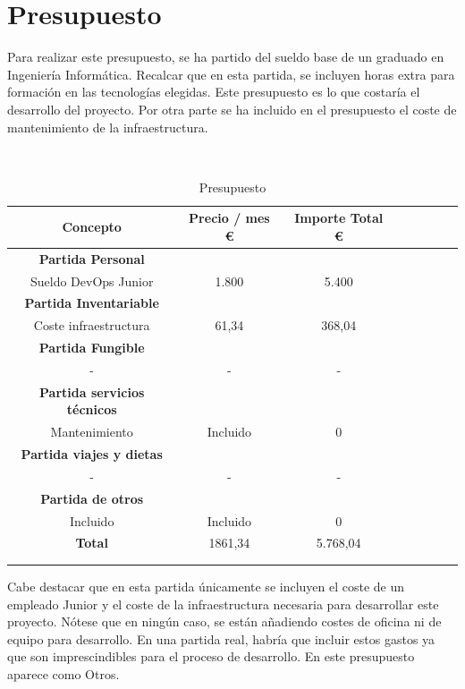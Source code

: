 \section{Presupuesto}
	\begin{text}
		Para realizar este presupuesto, se ha partido del sueldo base de un graduado en Ingeniería Informática. Recalcar que en esta partida, se incluyen horas extra para formación en las tecnologías elegidas. Este presupuesto es lo que costaría el desarrollo del proyecto.
		Por otra parte se ha incluido en el presupuesto el coste de mantenimiento de la infraestructura.
	\end{text}
	\\
	\begin{table}[ht]
		\centering
		\begin{tabular}[!hbt]{SSSSSSSS} \toprule
			{Concepto} &  {Precio / mes \euro} & {Importe Total \euro} \\ \midrule
			{\textbf{Partida Personal}} \\ \midrule
			{Sueldo DevOps Junior}  & {1.800} & {5.400}  \\
		    \midrule
			{\textbf{Partida Inventariable}} \\ \midrule
			{Coste infraestructura}  & {61,34}  & {368,04}   \\
			\midrule
			{\textbf{Partida Fungible}} \\ \midrule
			{-}  & {-}  & {-}   \\
			\midrule
			{\textbf{Partida servicios técnicos}} \\ \midrule
			{Mantenimiento}  & {Incluido}  & {0} \\
			\midrule	
			{\textbf{Partida viajes y dietas}} \\ \midrule
			{-}  & {-}  & {-} \\
			\midrule	
			{\textbf{Partida de otros}} \\ \midrule
			{Incluido}  & {Incluido}  & {0} \\
			\midrule	
			{\textbf{Total}}  & {1861,34}  & {5.768,04} \\
			\\ \midrule
		 \\ \bottomrule
		\end{tabular}
		\caption[Presupuesto]{Presupuesto \cite{presupuesto:online}} 
		\label{Presupuesto}
	\end{table}

	\begin{text}
		Cabe destacar que en esta partida únicamente se incluyen el coste de un empleado Junior y el coste de la infraestructura necesaria para desarrollar este proyecto. Nótese que en ningún caso, se están añadiendo costes de oficina ni de equipo para desarrollo. En una partida real, habría que incluir estos gastos ya que son imprescindibles para el proceso de desarrollo. En este presupuesto aparece como Otros.
	\end{text}